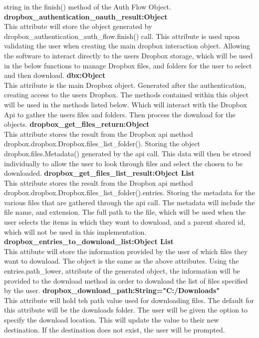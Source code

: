     string in the finish() method of the Auth Flow Object. 
\textbf{dropbox\_authentication\_oauth\_result:Object} \\
    This attribute will store the object generated by dropbox\_authentication\_auth\_flow.finish() call. This attribute is used upon validating
    the user when creating the main dropbox interaction object. Allowing the software to interact directly to the users Dropbox storage, 
    which will be used in the below functions to manage Dropbox files, and folders for the user to select and then download. 
\textbf{dbx:Object} \\
    This attribute is the main Dropbox object. Generated after the authentication, creating access to the users Dropbox. The methods contained 
    within this object will be used in the methods listed below. Which will interact with the Dropbox Api to gather the users files and folders.
    Then process the download for the objects. 
\textbf{dropbox\_get\_files\_return:Object} \\
    This attribute stores the result from the Dropbox api method dropbox.dropbox.Dropbox.files\_list\_folder(). Storing the object 
    dropbox.files.Metadata() generated by the api call. This data will then be stroed individually to allow the user to look through 
    files and select the chosen to be downloaded.
\textbf{dropbox\_get\_files\_list\_result:Object List} \\
    This attribute stores the result from the Dropbox api method dropbox.dropbox.Dropbox.files\_list\_folder().entries. Storing the metadata for 
    the various files that are gathered through the api call. The metadata will include the file name, and extension. The full path to the file, 
    which will be used when the user selects the items in which they want to download, and a parent shared id, which will not be used in this 
    implementation.
\textbf{dropbox\_entries\_to\_download\_list:Object List} \\
    This attibute will store the information provided by the user of which files they want to download. The object is the same as the above 
    attributes. Using the entries.path\_lower, attribute of the generated object, the information will be provided to the download method in 
    order to download the list of files specified by the user.
\textbf{dropbox\_download\_path:String="C:/Downloads"} \\
    This attribute will hold teh path value used for downloading files. The default for this attribute will be the downloads folder. The user 
    will be given the option to specify the download location. This will update the value to their new destination. If the destination does 
    not exist, the user will be prompted.

